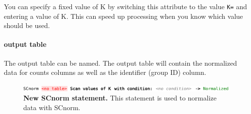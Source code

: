  You can specify a fixed value of K by switching this attribute to the value \texttt{K=} and entering a value of K. This can speed up processing when you know which value should be used.
 \paragraph{output table}
The output table can be named. The output table will contain the normalized data for counts columns as well as the identifier (group ID) column.
 
\begin{figure}[h!tbp]
  \centering
  \includegraphics[width=\figWidthWide]{figures/NewSCnorm.pdf}
\caption[New SCnorm statement.]{\textbf{New SCnorm statement.} This statement is used to normalize data with SCnorm.}
\label{fig:NewSCnorm.pdf}
\end{figure}